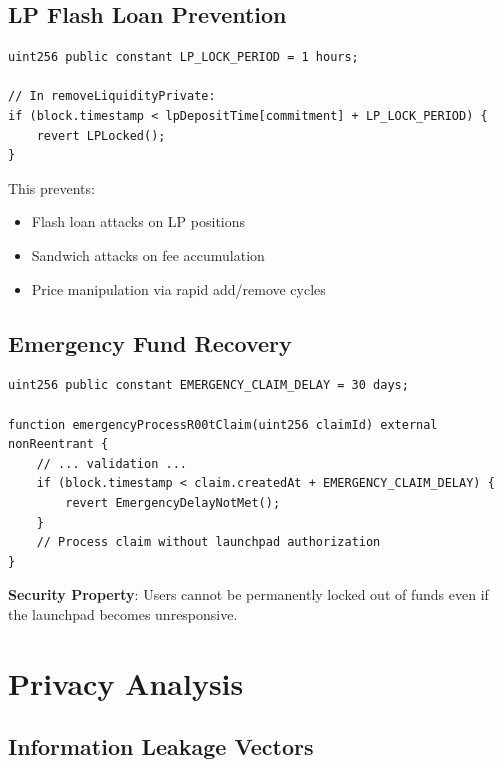 \documentclass[11pt,a4paper]{article}
\begin{document}
\subsection{LP Flash Loan Prevention}

\begin{lstlisting}[style=solidity, caption={LP Lock Period (ZkAMMv3.sol concept)}]
uint256 public constant LP_LOCK_PERIOD = 1 hours;

// In removeLiquidityPrivate:
if (block.timestamp < lpDepositTime[commitment] + LP_LOCK_PERIOD) {
    revert LPLocked();
}
\end{lstlisting}

This prevents:
\begin{itemize}
    \item Flash loan attacks on LP positions
    \item Sandwich attacks on fee accumulation
    \item Price manipulation via rapid add/remove cycles
\end{itemize}

\subsection{Emergency Fund Recovery}

\begin{lstlisting}[style=solidity, caption={Emergency Claim (ZkAMMPair.sol:383-411)}]
uint256 public constant EMERGENCY_CLAIM_DELAY = 30 days;

function emergencyProcessR00tClaim(uint256 claimId) external nonReentrant {
    // ... validation ...
    if (block.timestamp < claim.createdAt + EMERGENCY_CLAIM_DELAY) {
        revert EmergencyDelayNotMet();
    }
    // Process claim without launchpad authorization
}
\end{lstlisting}

\textbf{Security Property}: Users cannot be permanently locked out of funds even if the launchpad becomes unresponsive.

\section{Privacy Analysis}

\subsection{Information Leakage Vectors}
\end{document}
